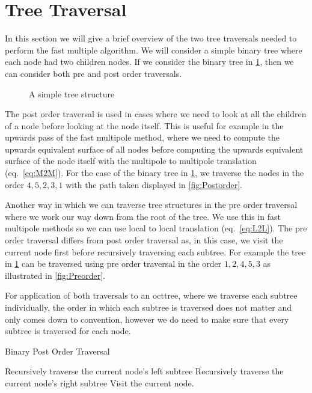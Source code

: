 \section{Tree Traversal}\label{appendix:Tree}
In this section we will give a brief overview of the two tree traversals needed to perform the fast multiple algorithm. We will consider a simple binary tree where each node had two children nodes. If we consider the binary tree in \cref{fig:BlankTree}, then we can consider both pre and post order traversals.
\begin{figure}[ht]
    \centering
    \resizebox{.4\linewidth}{!}{}
    \caption{A simple tree structure}
    \label{fig:BlankTree}
\end{figure}
The post order traversal is used in cases where we need to look at all the children of a node before looking at the node itself. This is useful for example in the upwards pass of the fast multipole method, where we need to compute the upwards equivalent surface of all nodes before computing the upwards equivalent surface of the node itself with the multipole to multipole translation (eq.~\ref{eq:M2M}). For the case of the binary tree in \cref{fig:BlankTree}, we traverse the nodes in the order $4, 5, 2, 3, 1$ with the path taken displayed in \cref{fig:Postorder}.

Another way in which we can traverse tree structures in the pre order traversal where we work our way down from the root of the tree. We use this in fast multipole methods so we can use local to local translation (eq.~\ref{eq:L2L}). The pre order traversal differs from post order traversal as, in this case, we visit the current node first before recursively traversing each subtree. For example the tree in \cref{fig:BlankTree} can be traversed using pre order traversal in the order $1, 2, 4, 5, 3$ as illustrated in \cref{fig:Preorder}.

For application of both traversals to an octtree, where we traverse each subtree individually, the order in which each subtree is traversed does not matter and only comes down to convention, however we do need to make sure that every subtree is traversed for each node.

\begin{algorithm}
\caption{Binary Post Order Traversal}
\begin{algorithmic}[1]
\State Recursively traverse the current node's left subtree
\State Recursively traverse the current node's right subtree
\State Visit the current node.
\end{algorithmic}
\end{algorithm}

